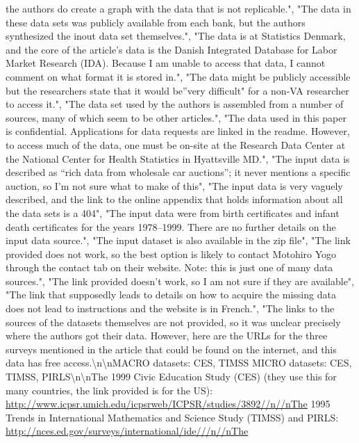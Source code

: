 \documentclass[]{article}
\begin{document}
\begin{itemize}
  the authors do create a graph with the data that is not replicable.",
  "The data in these data sets was publicly available from each bank,
  but the authors synthesized the inout data set themselves.", "The data
  is at Statistics Denmark, and the core of the article's data is the
  Danish Integrated Database for Labor Market Research (IDA). Because I
  am unable to access that data, I cannot comment on what format it is
  stored in.", "The data might be publicly accessible but the
  researchers state that it would be''very difficult" for a non-VA
  researcher to access it.", "The data set used by the authors is
  assembled from a number of sources, many of which seem to be other
  articles.", "The data used in this paper is confidential. Applications
  for data requests are linked in the readme. However, to access much of
  the data, one must be on-site at the Research Data Center at the
  National Center for Health Statistics in Hyattsville MD.", "The input
  data is described as ``rich data from wholesale car auctions''; it
  never mentions a specific auction, so I'm not sure what to make of
  this", "The input data is very vaguely described, and the link to the
  online appendix that holds information about all the data sets is a
  404", "The input data were from birth certificates and infant death
  certificates for the years 1978--1999. There are no further details on
  the input data source.", "The input dataset is also available in the
  zip file", "The link provided does not work, so the best option is
  likely to contact Motohiro Yogo through the contact tab on their
  website. Note: this is just one of many data sources.", "The link
  provided doesn't work, so I am not sure if they are available", "The
  link that supposedly leads to details on how to acquire the missing
  data does not lead to instructions and the website is in French.",
  "The links to the sources of the datasets themselves are not provided,
  so it was unclear precisely where the authors got their data. However,
  here are the URLs for the three surveys mentioned in the article that
  could be found on the internet, and this data has free
  access.\textbackslash{}n\textbackslash{}nMACRO datasets: CES, TIMSS
  \textbar{} MICRO datasets: CES, TIMSS,
  PIRLS\textbackslash{}n\textbackslash{}nThe 1999 Civic Education Study
  (CES) (they use this for many countries, the link provided is for the
  US):
  \url{http://www.icpsr.umich.edu/icpsrweb/ICPSR/studies/3892//n//nThe}
  1995 Trends in International Mathematics and Science Study (TIMSS) and
  PIRLS: \url{http://nces.ed.gov/surveys/international/ide///n//nThe}

\end{itemize}
\end{document}
